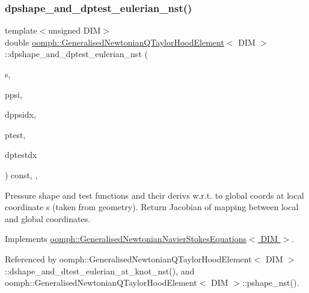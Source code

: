 \subsubsection{\texorpdfstring{dpshape\+\_\+and\+\_\+dptest\+\_\+eulerian\+\_\+nst()}{dpshape\_and\_dptest\_eulerian\_nst()}\hspace{0.1cm}{\footnotesize\ttfamily [1/3]}}
{\footnotesize\ttfamily template$<$unsigned D\+IM$>$ \\
double \hyperlink{classoomph_1_1GeneralisedNewtonianQTaylorHoodElement}{oomph\+::\+Generalised\+Newtonian\+Q\+Taylor\+Hood\+Element}$<$ D\+IM $>$\+::dpshape\+\_\+and\+\_\+dptest\+\_\+eulerian\+\_\+nst (\begin{DoxyParamCaption}\item[{const \hyperlink{classoomph_1_1Vector}{Vector}$<$ double $>$ \&}]{s,  }\item[{\hyperlink{classoomph_1_1Shape}{Shape} \&}]{ppsi,  }\item[{\hyperlink{classoomph_1_1DShape}{D\+Shape} \&}]{dppsidx,  }\item[{\hyperlink{classoomph_1_1Shape}{Shape} \&}]{ptest,  }\item[{\hyperlink{classoomph_1_1DShape}{D\+Shape} \&}]{dptestdx }\end{DoxyParamCaption}) const\hspace{0.3cm}{\ttfamily [inline]}, {\ttfamily [protected]}, {\ttfamily [virtual]}}



Pressure shape and test functions and their derivs w.\+r.\+t. to global coords at local coordinate s (taken from geometry). Return Jacobian of mapping between local and global coordinates. 



Implements \hyperlink{classoomph_1_1GeneralisedNewtonianNavierStokesEquations_a00027d27dfdf3c0b72b0d1df9addfdc8}{oomph\+::\+Generalised\+Newtonian\+Navier\+Stokes\+Equations$<$ D\+I\+M $>$}.



Referenced by oomph\+::\+Generalised\+Newtonian\+Q\+Taylor\+Hood\+Element$<$ D\+I\+M $>$\+::dshape\+\_\+and\+\_\+dtest\+\_\+eulerian\+\_\+at\+\_\+knot\+\_\+nst(), and oomph\+::\+Generalised\+Newtonian\+Q\+Taylor\+Hood\+Element$<$ D\+I\+M $>$\+::pshape\+\_\+nst().

\mbox{\label{classoomph_1_1GeneralisedNewtonianQTaylorHoodElement_a4d94bb8e50b3f5c4a08e7913e7ea2477}} 

